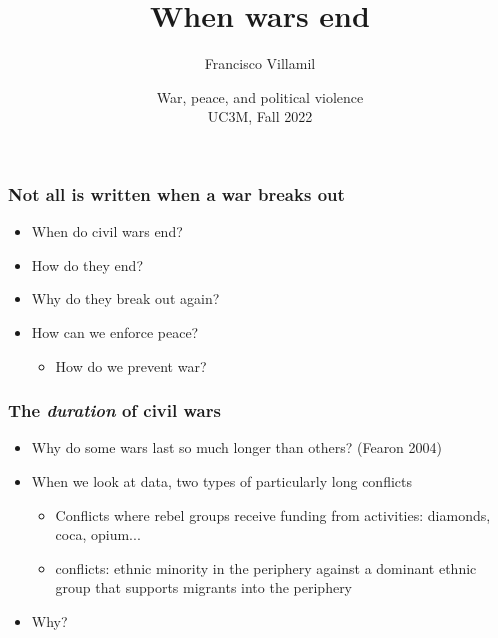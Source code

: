 \documentclass[aspectratio=43]{beamer}
\title{\huge When wars end}
\author{Francisco Villamil}
\date{War, peace, and political violence\\UC3M, Fall 2022}
\begin{document}
\begin{frame}
  \titlepage
\end{frame}

\begin{frame}
\frametitle{Not all is written when a war breaks out}
\centering

\begin{itemize}[<+->]
  \item When do civil wars end?
  \item How do they end?
  \item Why do they break out again?
  \item How can we enforce peace?
  \begin{itemize}
    \item How do we prevent war?
  \end{itemize}
\end{itemize}

\end{frame}

\begin{frame}
\frametitle{The \textit{duration} of civil wars}
\centering

\begin{itemize}[<+->]
  \item Why do some wars last so much longer than others? {\scriptsize (Fearon 2004)}
  \item When we look at data, two types of particularly long conflicts
  \begin{itemize}
    \item Conflicts where rebel groups receive funding from {\color{red}{contraband}} activities: diamonds, coca, opium...
    \item {\color{red}{`Sons-of-the-soil'}} conflicts: ethnic minority in the periphery against a dominant ethnic group that supports migrants into the periphery
  \end{itemize}
  \item Why?
\end{itemize}

\end{frame}
\end{document}
